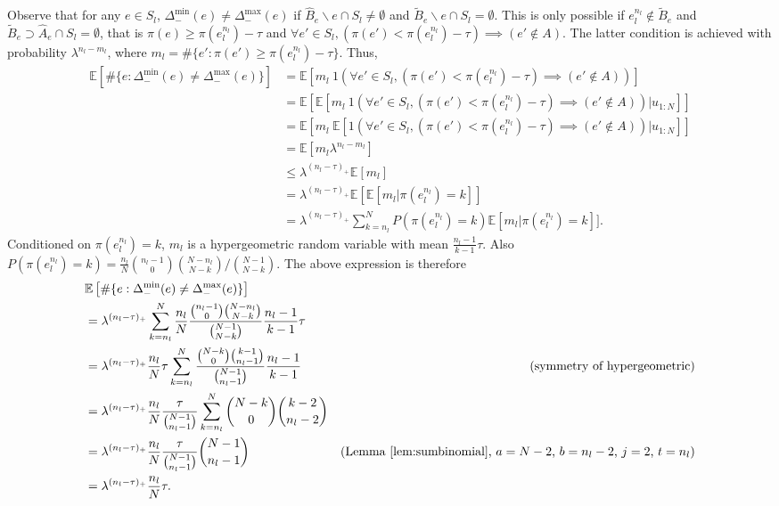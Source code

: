 Observe that for any $e\in S_l$, $\Delta_-^{\min}(e) \neq \Delta_-^{\max}(e)$ if $\hat{B}_e\backslash e \cap S_l \neq\emptyset$ and $\tilde{B}_e\backslash e \cap S_l = \emptyset$.
This is only possible if $e_l^{n_l} \not\in \tilde{B}_e$ and $\tilde{B}_e\supset\hat{A}_e \cap S_l = \emptyset$, that is $\pi(e) \geq \pi(e_l^{n_l}) - \tau$ and $\forall e' \in S_l, (\pi(e') < \pi(e_l^{n_l}) - \tau) \implies (e' \not\in A)$.
The latter condition is achieved with probability $\lambda^{n_l-m_l}$, where $m_l = \#\{e' : \pi(e') \geq \pi(e_l^{n_l})-\tau\}$.
Thus,
\begin{align*}
\mathbb{E}\left[\#\{e : \Delta_-^{\min}(e)\neq\Delta_-^{\max}(e)\}\right]
&= \mathbb{E}[m_l ~ 1(\forall e' \in S_l, (\pi(e') < \pi(e_l^{n_l}) - \tau) \implies (e' \not\in A))]\\
&= \mathbb{E}[\mathbb{E}[m_l ~ 1(\forall e' \in S_l, (\pi(e') < \pi(e_l^{n_l}) - \tau) \implies (e' \not\in A))|u_{1:N}]]\\
&= \mathbb{E}[m_l ~ \mathbb{E}[1(\forall e' \in S_l, (\pi(e') < \pi(e_l^{n_l}) - \tau) \implies (e' \not\in A))|u_{1:N}]]\\
&= \mathbb{E}[m_l \lambda^{n_l-m_l}]\\
&\leq \lambda^{(n_l-\tau)_+} \mathbb{E}[m_l]\\
&= \lambda^{(n_l-\tau)_+} \mathbb{E}[\mathbb{E}[m_l | \pi(e_l^{n_l}) = k]]\\
&= \lambda^{(n_l-\tau)_+} \sum_{k=n_l}^N P(\pi(e_l^{n_l}) = k) \mathbb{E}[m_l | \pi(e_l^{n_l}) = k]].
\end{align*}
Conditioned on $\pi(e_l^{n_l}) = k$, $m_l$ is a hypergeometric random variable with mean $\frac{n_l-1}{k-1}\tau$.
Also $P(\pi(e_l^{n_l}) = k) = \frac{n_l}{N} {n_l-1 \choose 0} {N-n_l \choose N-k} / {N-1 \choose N-k}$.
The above expression is therefore
\begin{align*}
&\mathbb{E}\left[\#\{e : \Delta_-^{\min}(e)\neq\Delta_-^{\max}(e)\}\right]\\
&= \lambda^{(n_l-\tau)_+} \sum_{k=n_l}^N \frac{n_l}{N} \frac{{n_l-1 \choose 0} {N-n_l \choose N-k}}{{N-1 \choose N-k}} \frac{n_l-1}{k-1}\tau\\
&= \lambda^{(n_l-\tau)_+} \frac{n_l}{N} \tau \sum_{k=n_l}^N \frac{{N-k \choose 0} {k-1 \choose n_l-1}}{{N-1 \choose n_l-1}} \frac{n_l-1}{k-1} & \text{(symmetry of hypergeometric)} \\
&= \lambda^{(n_l-\tau)_+} \frac{n_l}{N} \frac{\tau}{{N-1 \choose n_l-1}} \sum_{k=n_l}^N {N-k \choose 0} {k-2 \choose n_l-2} \\
&= \lambda^{(n_l-\tau)_+} \frac{n_l}{N} \frac{\tau}{{N-1 \choose n_l-1}} {N-1 \choose n_l-1} & \text{(Lemma \ref{lem:sumbinomial}, $a=N-2$, $b=n_l-2$, $j=2$, $t=n_l$)} \\
&= \lambda^{(n_l-\tau)_+} \frac{n_l}{N} \tau.
\end{align*}

